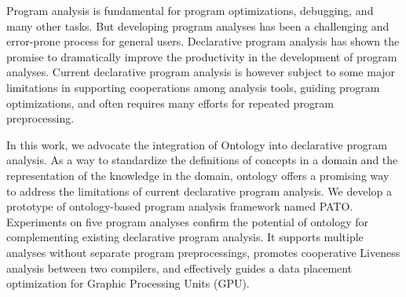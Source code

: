 Program analysis is fundamental for program optimizations, debugging,
and many other tasks. But developing program analyses has been a
challenging and error-prone process for general users.  Declarative
program analysis has shown the promise to dramatically improve the
productivity in the development of program analyses. Current
declarative program analysis is however subject to some major
limitations in supporting cooperations among analysis tools, guiding
program optimizations, and often requires many efforts for repeated
program preprocessing. 

In this work, we advocate the integration of Ontology into declarative
program analysis. As a way to standardize the definitions of concepts
in a domain and the representation of the knowledge in the domain,
ontology offers a promising way to address the limitations of current
declarative program analysis.  We develop a prototype of
ontology-based program analysis framework named PATO.  Experiments on
five program analyses confirm the potential of ontology for
complementing existing declarative program analysis. It supports
multiple analyses without separate program preprocessings, promotes
cooperative Liveness analysis between two compilers, and effectively
guides a data placement optimization for Graphic Processing Units
(GPU).
